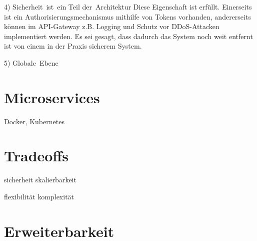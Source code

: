 4) Sicherheit ist ein Teil der Architektur
Diese Eigenschaft ist erfüllt. Einerseits ist ein Authorisierungsmechanismus mithilfe von Tokens vorhanden, andererseits können im API-Gateway z.B. Logging und Schutz vor DDoS-Attacken implementiert werden. Es sei gesagt, dass dadurch das System noch weit entfernt ist von einem in der Praxis sicherem System.


5) Globale Ebene

\section{Microservices}
 Docker, Kubernetes
 
\section{Tradeoffs}
sicherheit skalierbarkeit

flexibilität komplexität

\section{Erweiterbarkeit}